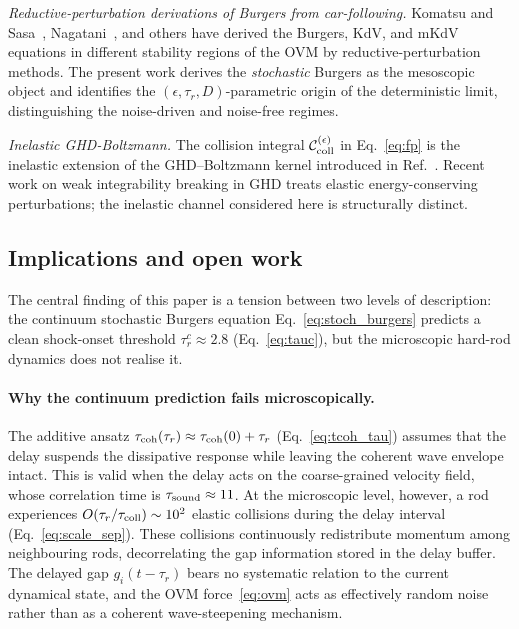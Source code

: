 \documentclass[aps,pre,twocolumn,superscriptaddress,longbibliography,floatfix]{revtex4-2}
\begin{document}
\emph{Reductive-perturbation derivations of Burgers from
car-following.} Komatsu and Sasa~\cite{Komatsu1995},
Nagatani~\cite{Nagatani1999}, and others have derived the
Burgers, KdV, and mKdV equations in different stability
regions of the OVM by reductive-perturbation methods. The
present work derives the \emph{stochastic} Burgers as the
mesoscopic object and identifies the
$(\epsilon, \tau_r, D)$-parametric origin of the deterministic
limit, distinguishing the noise-driven and noise-free regimes.

\emph{Inelastic GHD-Boltzmann.} The
collision integral $\mathcal{C}_{\rm coll}^{(\epsilon)}$ in
Eq.~\eqref{eq:fp} is the inelastic extension of the
GHD--Boltzmann kernel introduced in Ref.~\cite{PaperIV}.
Recent work on weak integrability breaking in GHD
\cite{DurninDoyon2021,WeakBreaking2023} treats elastic
energy-conserving perturbations; the inelastic channel
considered here is structurally distinct.

\subsection{Implications and open work}

The central finding of this paper is a tension between
two levels of description: the continuum stochastic Burgers
equation Eq.~\eqref{eq:stoch_burgers} predicts a clean
shock-onset threshold $\tau_r^c\approx 2.8$
(Eq.~\eqref{eq:tauc}), but the microscopic hard-rod dynamics
does not realise it.

\paragraph*{Why the continuum prediction fails microscopically.}
The additive ansatz
$\tau_{\rm coh}(\tau_r)\approx\tau_{\rm coh}(0)+\tau_r$
(Eq.~\eqref{eq:tcoh_tau}) assumes that the delay suspends
the dissipative response while leaving the coherent
wave envelope intact. This is valid when the delay acts on
the coarse-grained velocity field, whose correlation time is
$\tau_{\rm sound}\approx 11$. At the microscopic level,
however, a rod experiences
$O(\tau_r/\tau_{\rm coll})\sim 10^2$ elastic collisions
during the delay interval
(Eq.~\eqref{eq:scale_sep}). These collisions continuously
redistribute momentum among neighbouring rods, decorrelating
the gap information stored in the delay buffer. The delayed
gap $g_i(t-\tau_r)$ bears no systematic relation to the
current dynamical state, and the OVM
force~\eqref{eq:ovm} acts as effectively random noise rather
than as a coherent wave-steepening mechanism.
\end{document}

